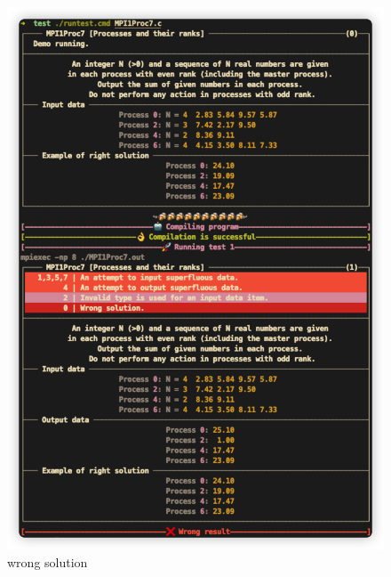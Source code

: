 \begin{frame}
\begin{columns}
\begin{figure}[htbp]
    \includegraphics[width=0.75
    \linewidth]{images/mpi1_eg_w.jpg}%
    \caption{wrong solution}%
    \label{wrong}%
\end{figure}

\end{columns}
\end{frame}

